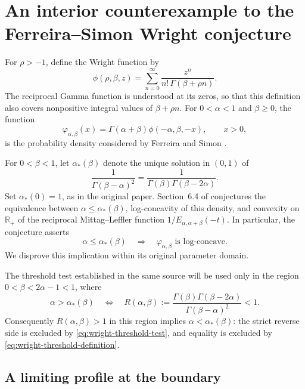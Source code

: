 \documentclass[11pt,a4paper]{article}
\theoremstyle{definition}
\theoremstyle{remark}
\numberwithin{equation}{section}
\begin{document}
\section{An interior counterexample to the Ferreira--Simon Wright conjecture}
\label{sec:wright-counterexample}

For $\rho>-1$, define the Wright function by
\[
 \phi(\rho,\beta,z)
 =\sum_{n=0}^{\infty}\frac{z^n}{n!\,\Gamma(\beta+\rho n)}.
\]
The reciprocal Gamma function is understood at its zeros, so that this
definition also covers nonpositive integral values of $\beta+\rho n$.
For $0<\alpha<1$ and $\beta\geq0$, the function
\[
 \varphi_{\alpha,\beta}(x)
 =\Gamma(\alpha+\beta)\phi(-\alpha,\beta,-x),\qquad x>0,
\]
is the probability density considered by Ferreira and Simon
\cite{FerreiraSimon2024}.

For $0<\beta<1$, let $\alpha_*(\beta)$ denote the unique solution in
$(0,1)$ of
\begin{equation}
 \frac{1}{\Gamma(\beta-\alpha)^2}
 =\frac{1}{\Gamma(\beta)\Gamma(\beta-2\alpha)}.
 \label{eq:wright-threshold-definition}
\end{equation}
Set $\alpha_*(0)=1$, as in the original paper. Section~6.4 of
\cite{FerreiraSimon2024} conjectures the equivalence between
$\alpha\leq\alpha_*(\beta)$, log-concavity of this density, and convexity
on $\mathbb R_+$ of the reciprocal Mittag--Leffler function
$1/E_{\alpha,\alpha+\beta}(-t)$. In particular, the conjecture asserts
\begin{equation}
 \alpha\leq\alpha_*(\beta)
 \quad\Longrightarrow\quad
 \varphi_{\alpha,\beta}\text{ is log-concave}.
 \label{eq:wright-original-implication}
\end{equation}
We disprove this implication within its original parameter domain.

The threshold test established in the same source will be used only in
the region $0<\beta<2\alpha-1<1$, where
\begin{equation}
 \alpha>\alpha_*(\beta)
 \quad\Longleftrightarrow\quad
 R(\alpha,\beta):=
 \frac{\Gamma(\beta)\Gamma(\beta-2\alpha)}
      {\Gamma(\beta-\alpha)^2}<1.
 \label{eq:wright-threshold-test}
\end{equation}
Consequently $R(\alpha,\beta)>1$ in this region implies
$\alpha<\alpha_*(\beta)$: the strict reverse side is excluded by
\eqref{eq:wright-threshold-test}, and equality is excluded by
\eqref{eq:wright-threshold-definition}.

\subsection{A limiting profile at the boundary}
\end{document}
